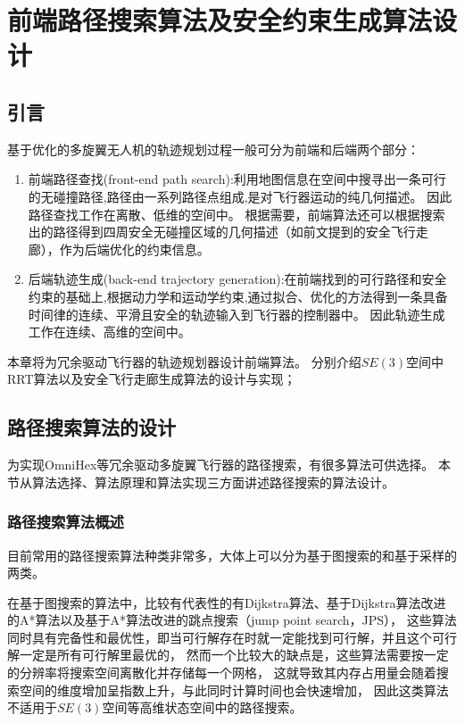 
\chapter{前端路径搜索算法及安全约束生成算法设计}\label{chap:front_end_algorithm}

\section{引言}\label{sec:intro_3}
基于优化的多旋翼无人机的轨迹规划过程一般可分为前端和后端两个部分：
\begin{enumerate}
  \renewcommand{\labelenumi}{(\theenumi)}
  \item 前端路径查找(front-end path search):利用地图信息在空间中搜寻出一条可行的无碰撞路径,路径由一系列路径点组成,是对飞行器运动的纯几何描述。
        因此路径查找工作在离散、低维的空间中。
        根据需要，前端算法还可以根据搜索出的路径得到四周安全无碰撞区域的几何描述（如前文提到的安全飞行走廊），作为后端优化的约束信息。
  \item 后端轨迹生成(back-end trajectory generation):在前端找到的可行路径和安全约束的基础上,根据动力学和运动学约束,通过拟合、优化的方法得到一条具备时间律的连续、平滑且安全的轨迹输入到飞行器的控制器中。
        因此轨迹生成工作在连续、高维的空间中。
\end{enumerate}

本章将为冗余驱动飞行器的轨迹规划器设计前端算法。
分别介绍$SE(3)$空间中RRT算法以及安全飞行走廊生成算法的设计与实现；

\section{路径搜索算法的设计}\label{sec:search_algorithm}
为实现OmniHex等冗余驱动多旋翼飞行器的路径搜索，有很多算法可供选择。
本节从算法选择、算法原理和算法实现三方面讲述路径搜索的算法设计。
\subsection{路径搜索算法概述}\label{subsec:path_search_overview}
目前常用的路径搜索算法种类非常多，大体上可以分为基于图搜索的和基于采样的两类。

在基于图搜索的算法中，比较有代表性的有Dijkstra算法、基于Dijkstra算法改进的A*算法\cite{hart1968formal}以及基于A*算法改进的跳点搜索（jump point search，JPS）\cite{harabor2011online}，
这些算法同时具有完备性和最优性，即当可行解存在时就一定能找到可行解，并且这个可行解一定是所有可行解里最优的，
然而一个比较大的缺点是，这些算法需要按一定的分辨率将搜索空间离散化并存储每一个网格，
这就导致其内存占用量会随着搜索空间的维度增加呈指数上升，与此同时计算时间也会快速增加，
因此这类算法不适用于$SE(3)$空间等高维状态空间中的路径搜索。

